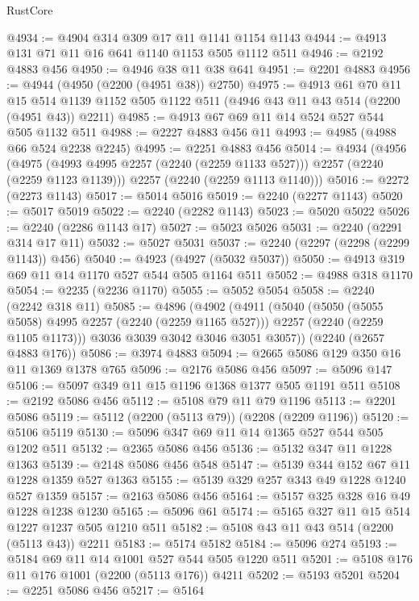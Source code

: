 \begin{lexlean}{RustCore}
\begin{coremodule}
@4934 := @4904 @314 @309 @17 @11 @1141 @1154 @1143
@4944 := @4913 @131 @71 @11 @16 @641 @1140 @1153 @505 @1112 @511
@4946 := @2192 @4883 @456
@4950 := @4946 @38 @11 @38 @641
@4951 := @2201 @4883
@4956 := @4944 (@4950 (@2200 (@4951 @38)) @2750)
@4975 := @4913
    @61
    @70
    @11
    @15
    @514
    @1139
    @1152
    @505
    @1122
    @511
    (@4946 @43 @11 @43 @514 (@2200 (@4951 @43)) @2211)
@4985 := @4913 @67 @69 @11 @14 @524 @527 @544 @505 @1132 @511
@4988 := @2227 @4883 @456 @11
@4993 := @4985 (@4988 @66 @524 @2238 @2245)
@4995 := @2251 @4883 @456
@5014 := @4934
    (@4956
      (@4975 (@4993 @4995 @2257 (@2240 (@2259 @1133 @527))) @2257 (@2240 (@2259 @1123 @1139)))
      @2257
      (@2240 (@2259 @1113 @1140)))
@5016 := @2272 (@2273 @1143)
@5017 := @5014 @5016
@5019 := @2240 (@2277 @1143)
@5020 := @5017 @5019
@5022 := @2240 (@2282 @1143)
@5023 := @5020 @5022
@5026 := @2240 (@2286 @1143 @17)
@5027 := @5023 @5026
@5031 := @2240 (@2291 @314 @17 @11)
@5032 := @5027 @5031
@5037 := @2240 (@2297 (@2298 (@2299 @1143)) @456)
@5040 := @4923 (@4927 (@5032 @5037))
@5050 := @4913 @319 @69 @11 @14 @1170 @527 @544 @505 @1164 @511
@5052 := @4988 @318 @1170
@5054 := @2235 (@2236 @1170)
@5055 := @5052 @5054
@5058 := @2240 (@2242 @318 @11)
@5085 := @4896
    (@4902
      (@4911
        (@5040
          (@5050 (@5055 @5058) @4995 @2257 (@2240 (@2259 @1165 @527)))
          @2257
          (@2240 (@2259 @1105 @1173)))
        @3036
        @3039
        @3042
        @3046
        @3051
        @3057))
    (@2240 (@2657 @4883 @176))
@5086 := @3974 @4883
@5094 := @2665 @5086 @129 @350 @16 @11 @1369 @1378 @765
@5096 := @2176 @5086 @456
@5097 := @5096 @147
@5106 := @5097 @349 @11 @15 @1196 @1368 @1377 @505 @1191 @511
@5108 := @2192 @5086 @456
@5112 := @5108 @79 @11 @79 @1196
@5113 := @2201 @5086
@5119 := @5112 (@2200 (@5113 @79)) (@2208 (@2209 @1196))
@5120 := @5106 @5119
@5130 := @5096 @347 @69 @11 @14 @1365 @527 @544 @505 @1202 @511
@5132 := @2365 @5086 @456
@5136 := @5132 @347 @11 @1228 @1363
@5139 := @2148 @5086 @456 @548
@5147 := @5139 @344 @152 @67 @11 @1228 @1359 @527 @1363
@5155 := @5139 @329 @257 @343 @49 @1228 @1240 @527 @1359
@5157 := @2163 @5086 @456
@5164 := @5157 @325 @328 @16 @49 @1228 @1238 @1230
@5165 := @5096 @61
@5174 := @5165 @327 @11 @15 @514 @1227 @1237 @505 @1210 @511
@5182 := @5108 @43 @11 @43 @514 (@2200 (@5113 @43)) @2211
@5183 := @5174 @5182
@5184 := @5096 @274
@5193 := @5184 @69 @11 @14 @1001 @527 @544 @505 @1220 @511
@5201 := @5108 @176 @11 @176 @1001 (@2200 (@5113 @176)) @4211
@5202 := @5193 @5201
@5204 := @2251 @5086 @456
@5217 := @5164

\end{coremodule}
\end{lexlean}

